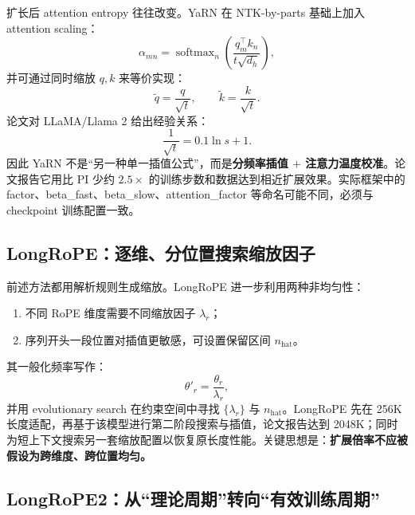 \documentclass[UTF8,fontset=none,a4paper,10pt]{ctexart}
\newcommand{\term}[1]{\textbf{#1}}
\newcommand{\softmax}{\operatorname{softmax}}
\begin{document}
扩长后 attention entropy 往往改变。YaRN 在 NTK-by-parts 基础上加入 attention scaling\cite{zh:peng2024yarn}：
\begin{equation}
  \alpha_{mn}=\softmax_n\!\left(
  \frac{q_m^\top k_n}{t\sqrt{d_h}}
  \right),
  \label{zh:eq:yarn-temperature}
\end{equation}
并可通过同时缩放 $q,k$ 来等价实现：
\begin{equation}
  \tilde q=\frac{q}{\sqrt{t}},\qquad
  \tilde k=\frac{k}{\sqrt{t}}.
  \label{zh:eq:yarn-qk-scale}
\end{equation}
论文对 LLaMA/Llama 2 给出经验关系：
\begin{equation}
  \frac{1}{\sqrt{t}}=0.1\ln s+1.
  \label{zh:eq:yarn-fit}
\end{equation}
因此 YaRN 不是“另一种单一插值公式”，而是\term{分频率插值 $+$ 注意力温度校准}。论文报告它用比 PI 少约 $2.5\times$ 的训练步数和数据达到相近扩展效果\cite{zh:peng2024yarn}。实际框架中的 \textnormal{factor}、\textnormal{beta\_fast}、\textnormal{beta\_slow}、\textnormal{attention\_factor} 等命名可能不同，必须与 checkpoint 训练配置一致。

\subsection{LongRoPE：逐维、分位置搜索缩放因子}

前述方法都用解析规则生成缩放。LongRoPE 进一步利用两种非均匀性\cite{zh:ding2024longrope}：
\begin{enumerate}
  \item 不同 RoPE 维度需要不同缩放因子 $\lambda_r$；
  \item 序列开头一段位置对插值更敏感，可设置保留区间 $n_{\mathrm{hat}}$。
\end{enumerate}
其一般化频率写作：
\begin{equation}
  \theta'_r=\frac{\theta_r}{\lambda_r},
  \label{zh:eq:longrope-scale}
\end{equation}
并用 evolutionary search 在约束空间中寻找 $\{\lambda_r\}$ 与 $n_{\mathrm{hat}}$。LongRoPE 先在 256K 长度适配，再基于该模型进行第二阶段搜索与插值，论文报告达到 2048K；同时为短上下文搜索另一套缩放配置以恢复原长度性能\cite{zh:ding2024longrope}。关键思想是：\term{扩展倍率不应被假设为跨维度、跨位置均匀。}

\subsection{LongRoPE2：从“理论周期”转向“有效训练周期”}
\end{document}

